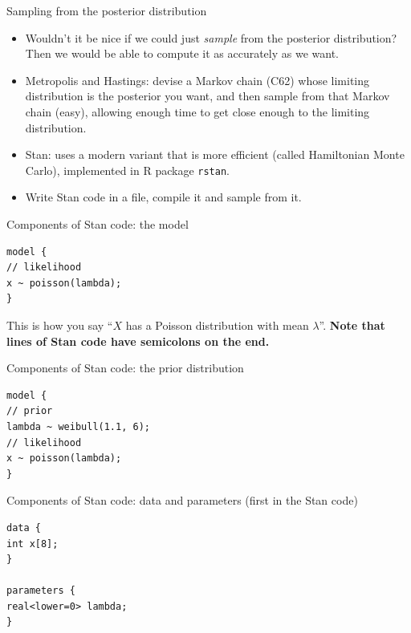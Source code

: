 \documentclass[
  ignorenonframetext,
]{beamer}
\begin{document}
\begin{frame}[fragile]{Sampling from the posterior distribution}
\protect\hypertarget{sampling-from-the-posterior-distribution}{}

\begin{itemize}
\item
  Wouldn't it be nice if we could just \emph{sample} from the posterior
  distribution? Then we would be able to compute it as accurately as we
  want.
\item
  Metropolis and Hastings: devise a Markov chain (C62) whose limiting
  distribution is the posterior you want, and then sample from that
  Markov chain (easy), allowing enough time to get close enough to the
  limiting distribution.
\item
  Stan: uses a modern variant that is more efficient (called Hamiltonian
  Monte Carlo), implemented in R package \texttt{rstan}.
\item
  Write Stan code in a file, compile it and sample from it.
\end{itemize}

\end{frame}

\begin{frame}[fragile]{Components of Stan code: the model}
\protect\hypertarget{components-of-stan-code-the-model}{}

\begin{verbatim}
model {
// likelihood
x ~ poisson(lambda);
}
\end{verbatim}

This is how you say ``\(X\) has a Poisson distribution with mean
\(\lambda\)''. \textbf{Note that lines of Stan code have semicolons on
the end.}

\end{frame}

\begin{frame}[fragile]{Components of Stan code: the prior distribution}
\protect\hypertarget{components-of-stan-code-the-prior-distribution}{}

\begin{verbatim}
model {
// prior
lambda ~ weibull(1.1, 6);
// likelihood
x ~ poisson(lambda);
}
\end{verbatim}

\end{frame}

\begin{frame}[fragile]{Components of Stan code: data and parameters
(first in the Stan code)}
\protect\hypertarget{components-of-stan-code-data-and-parameters-first-in-the-stan-code}{}

\begin{verbatim}
data {
int x[8];
}

parameters {
real<lower=0> lambda;
}
\end{verbatim}

\end{frame}
\end{document}
